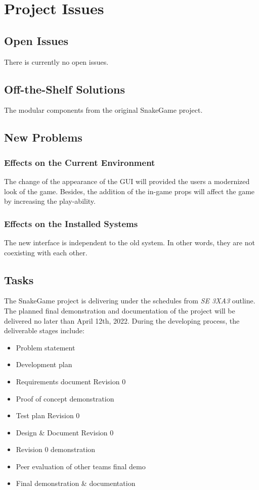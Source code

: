 \documentclass[12pt, titlepage]{article}
\begin{document}

\section{Project Issues}

\subsection{Open Issues}
There is currently no open issues.
\subsection{Off-the-Shelf Solutions}
The modular components from the original SnakeGame project.

\subsection{New Problems}
\subsubsection{Effects on the Current Environment}
The change of the appearance of the GUI will provided the users a modernized look of the game. Besides, the addition of the in-game props will affect the game by increasing the play-ability.

\subsubsection{Effects on the Installed Systems}
The new interface is independent to the old system. In other words, they are not coexisting with each other.


\subsection{Tasks}
The SnakeGame project is delivering under the schedules from \textit{SE 3XA3} outline. The planned final demonstration and documentation of the project will be delivered no later than 
April 12th, 2022. During the developing process, the deliverable stages include:
\begin{itemize}
    \item Problem statement
    \item Development plan
    \item Requirements document Revision 0
    \item Proof of concept demonstration 
    \item Test plan Revision 0
    \item Design \& Document Revision 0
    \item Revision 0 demonstration
    \item Peer evaluation of other teams final demo
    \item Final demonstration \& documentation
\end{itemize}
\end{document}
